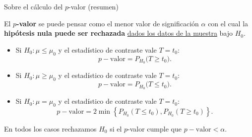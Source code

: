 \documentclass{beamer}
\theoremstyle{definition}
\begin{document}
\begin{frame}{\color{rosee}Sobre el cálculo del $p$-valor (resumen) }\small

El \textbf{$p$-valor} se puede pensar como el menor valor de significación $\alpha$ con el cual la \textbf{hipótesis nula puede ser rechazada} \underline{dados los datos de la muestra} bajo $H_0$.

\medskip
\begin{itemize}
\item Si $H_0:\mu \leq \mu_0$ y el estadístico de contraste vale $T=t_0$: $$p-\text{valor} = P_{H_0}\big( T \geq t_0\big).$$
\item Si $H_0:\mu \geq \mu_0$ y el estadístico de contraste vale $T=t_0$: $$p-\text{valor} = P_{H_0}\big( T \leq t_0\big).$$
\item Si $H_0:\mu = \mu_0$ y el estadístico de contraste vale $T=t_0$: $$p-\text{valor} = 2 \min\left\{P_{H_0} (T \leq t_0),P_{H_0}( T \geq t_0)\right\}.$$

\end{itemize}
En todos los casos rechazamos $H_0$ si el $p$-valor cumple que $p-\text{valor}<\alpha$.
\end{frame}
\end{document}
